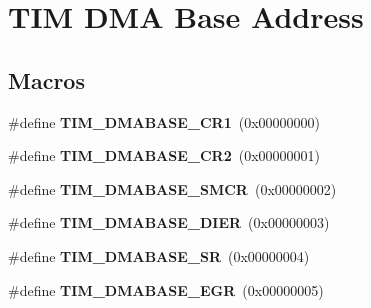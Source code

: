 \hypertarget{group___t_i_m___d_m_a___base__address}{\section{T\-I\-M D\-M\-A Base Address}
\label{group___t_i_m___d_m_a___base__address}
}
\subsection*{Macros}
\begin{DoxyCompactItemize}
\item 
\hypertarget{group___t_i_m___d_m_a___base__address_ga97bbe74e5ae8680c020a6b0f760d8909}{\#define {\bfseries T\-I\-M\-\_\-\-D\-M\-A\-B\-A\-S\-E\-\_\-\-C\-R1}~(0x00000000)}\label{group___t_i_m___d_m_a___base__address_ga97bbe74e5ae8680c020a6b0f760d8909}

\item 
\hypertarget{group___t_i_m___d_m_a___base__address_ga53d60ce92015bb60d608e60c45b1fdda}{\#define {\bfseries T\-I\-M\-\_\-\-D\-M\-A\-B\-A\-S\-E\-\_\-\-C\-R2}~(0x00000001)}\label{group___t_i_m___d_m_a___base__address_ga53d60ce92015bb60d608e60c45b1fdda}

\item 
\hypertarget{group___t_i_m___d_m_a___base__address_ga184ad86a4c6d48263f57d3e7106675c4}{\#define {\bfseries T\-I\-M\-\_\-\-D\-M\-A\-B\-A\-S\-E\-\_\-\-S\-M\-C\-R}~(0x00000002)}\label{group___t_i_m___d_m_a___base__address_ga184ad86a4c6d48263f57d3e7106675c4}

\item 
\hypertarget{group___t_i_m___d_m_a___base__address_ga137d2e3858ae68333646fea6e04503da}{\#define {\bfseries T\-I\-M\-\_\-\-D\-M\-A\-B\-A\-S\-E\-\_\-\-D\-I\-E\-R}~(0x00000003)}\label{group___t_i_m___d_m_a___base__address_ga137d2e3858ae68333646fea6e04503da}

\item 
\hypertarget{group___t_i_m___d_m_a___base__address_gaf0da2213e3e7b6aaaa9b738ec85abc02}{\#define {\bfseries T\-I\-M\-\_\-\-D\-M\-A\-B\-A\-S\-E\-\_\-\-S\-R}~(0x00000004)}\label{group___t_i_m___d_m_a___base__address_gaf0da2213e3e7b6aaaa9b738ec85abc02}

\item 
\hypertarget{group___t_i_m___d_m_a___base__address_gaff6d230aafb918047d62e877d21b3bdc}{\#define {\bfseries T\-I\-M\-\_\-\-D\-M\-A\-B\-A\-S\-E\-\_\-\-E\-G\-R}~(0x00000005)}\label{group___t_i_m___d_m_a___base__address_gaff6d230aafb918047d62e877d21b3bdc}


\end{DoxyCompactItemize}
